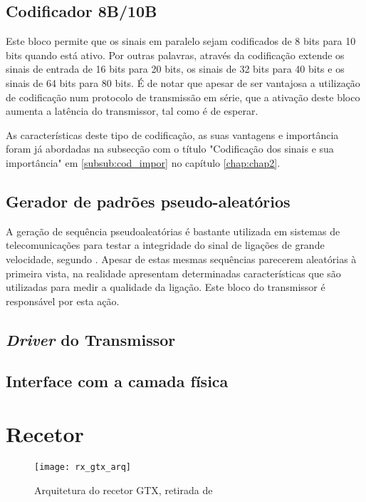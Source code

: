 \subsection{Codificador 8B/10B}

Este bloco permite que os sinais em paralelo sejam codificados de 8 bits para 10 bits quando está ativo. Por outras palavras, através da codificação extende os sinais de entrada de 16 bits para 20 bits, os sinais de 32 bits para 40 bits e os sinais de 64 bits para 80 bits. É de notar que apesar de ser vantajosa a utilização de codificação num protocolo de transmissão em série, que a ativação deste bloco aumenta a latência do transmissor, tal como é de esperar.

As características deste tipo de codificação, as suas vantagens e importância foram já abordadas na subsecção com o título "Codificação dos sinais e sua importância" em \ref{subsub:cod_impor} no capítulo \ref{chap:chap2}.

\subsection{Gerador de padrões pseudo-aleatórios}

A geração de sequência pseudoaleatórias é bastante utilizada em sistemas de telecomunicações para testar a integridade do sinal de ligações de grande velocidade, segundo \cite{R011}. Apesar de estas mesmas sequências parecerem aleatórias à primeira vista, na realidade apresentam determinadas características que são utilizadas para medir a qualidade da ligação. Este bloco do transmissor é responsável por esta ação. 

\subsection{\textit{Driver} do Transmissor}

\subsection{Interface com a camada física}

\section{Recetor} \label{sec_rx_gtx}

\begin{figure}[h!]
	\begin{center}
		\leavevmode
		\texttt{[image: rx\_gtx\_arq]}
		\caption{Arquitetura do recetor GTX, retirada de \cite{R011}}
		\label{fig:gtx_rx_arq}
	\end{center}
\end{figure}	

